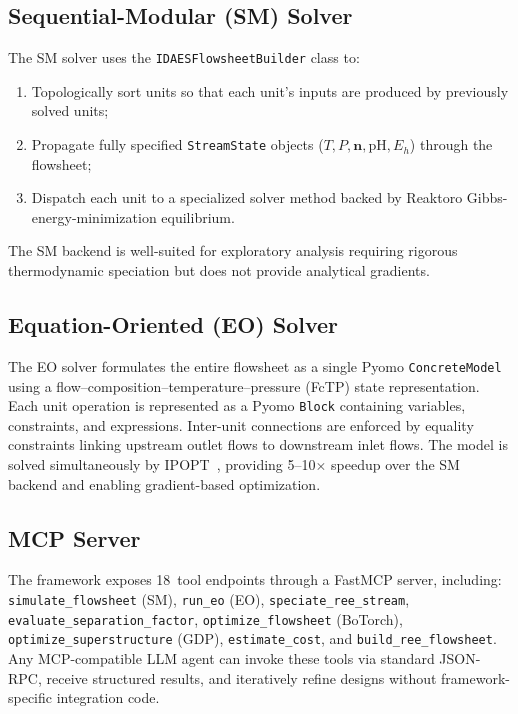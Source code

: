 \documentclass[11pt]{article}
\begin{document}
\subsection{Sequential-Modular (SM) Solver}

The SM solver uses the \texttt{IDAESFlowsheetBuilder} class to:
\begin{enumerate}
  \item Topologically sort units so that each unit's inputs are produced
    by previously solved units;
  \item Propagate fully specified \texttt{StreamState} objects
    ($T, P, \mathbf{n}, \text{pH}, E_h$) through the flowsheet;
  \item Dispatch each unit to a specialized solver method backed by
    Reaktoro Gibbs-energy-minimization equilibrium.
\end{enumerate}
The SM backend is well-suited for exploratory analysis requiring rigorous
thermodynamic speciation but does not provide analytical gradients.

\subsection{Equation-Oriented (EO) Solver}

The EO solver formulates the entire flowsheet as a single Pyomo
\texttt{ConcreteModel} using a flow--composition--temperature--pressure
(FcTP) state representation.  Each unit operation is represented as a
Pyomo \texttt{Block} containing variables, constraints, and expressions.
Inter-unit connections are enforced by equality constraints linking
upstream outlet flows to downstream inlet flows.  The model is solved
simultaneously by IPOPT~\citep{wachter2006implementation}, providing
5--10$\times$ speedup over the SM backend and enabling gradient-based
optimization.

\subsection{MCP Server}

The framework exposes 18~tool endpoints through a FastMCP server,
including: \texttt{simulate\_flowsheet} (SM),
\texttt{run\_eo} (EO), \texttt{speciate\_ree\_stream},
\texttt{evaluate\_separation\_factor}, \texttt{optimize\_flowsheet}
(BoTorch), \texttt{optimize\_superstructure} (GDP), \texttt{estimate\_cost},
and \texttt{build\_ree\_flowsheet}.  Any MCP-compatible LLM agent can
invoke these tools via standard JSON-RPC, receive structured results,
and iteratively refine designs without framework-specific integration
code.
\end{document}
